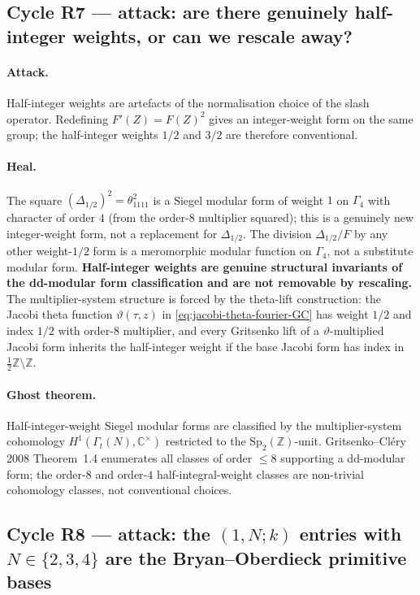 \subsection*{Cycle R7 --- attack: are there genuinely half-integer
weights, or can we rescale away?}

\paragraph{Attack.} Half-integer weights are artefacts of the
normalisation choice of the slash operator. Redefining
$F'(Z) = F(Z)^2$ gives an integer-weight form on the same group; the
half-integer weights $1/2$ and $3/2$ are therefore conventional.

\paragraph{Heal.} The square $(\Delta_{1/2})^2 = \theta_{1111}^2$ is a
Siegel modular form of weight $1$ on $\Gamma_4$ with character of order
$4$ (from the order-$8$ multiplier squared); this is a genuinely new
integer-weight form, not a replacement for $\Delta_{1/2}$. The division
$\Delta_{1/2}/F$ by any other weight-$1/2$ form is a meromorphic
modular function on $\Gamma_4$, not a substitute modular form.
\textbf{Half-integer weights are genuine structural invariants of the
dd-modular form classification and are not removable by rescaling.}
The multiplier-system structure is forced by the theta-lift
construction: the Jacobi theta function $\vartheta(\tau, z)$ in
\eqref{eq:jacobi-theta-fourier-GC} has weight $1/2$ and index $1/2$
with order-$8$ multiplier, and every Gritsenko lift of a
$\vartheta$-multiplied Jacobi form inherits the half-integer weight
if the base Jacobi form has index in $\tfrac{1}{2}\mathbb{Z} \setminus
\mathbb{Z}$.

\paragraph{Ghost theorem.} Half-integer-weight Siegel modular forms
are classified by the multiplier-system cohomology
$H^1(\Gamma_t(N), \mathbb{C}^\times)$ restricted to the
$\mathrm{Sp}_2(\mathbb{Z})$-unit. Gritsenko--Cl\'ery 2008 Theorem~1.4
enumerates all classes of order $\leq 8$ supporting a dd-modular form;
the order-$8$ and order-$4$ half-integral-weight classes are
non-trivial cohomology classes, not conventional choices.

\subsection*{Cycle R8 --- attack: the $(1, N; k)$ entries with
$N \in \{2, 3, 4\}$ are the Bryan--Oberdieck primitive bases}

